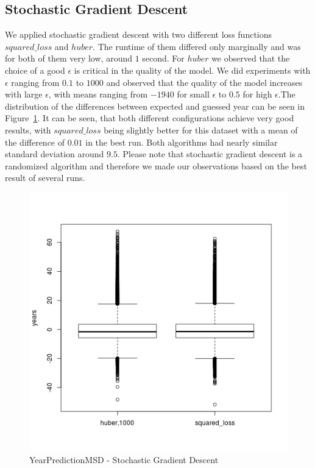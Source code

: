 \subsection{Stochastic Gradient Descent}
We applied stochastic gradient descent with two different loss functions $squared\_loss$ and $huber$. The runtime of them differed only marginally and was for both of them very low, around $1$ second. For $huber$ we observed that the choice of a good $\epsilon$ is critical in the quality of the model. We did experiments with $\epsilon$ ranging from $0.1$ to $1000$ and observed that the quality of the model increases with large $\epsilon$, with means ranging from $-1940$ for small $\epsilon$ to $0.5$ for high $\epsilon$.The distribution of the differences between expected and guessed year can be seen in Figure~\ref{ypmsd:fig:sgdresults}. It can be seen, that both different configurations achieve very good results, with $squared\_loss$ being slightly better for this dataset with a mean of the difference of $0.01$ in the best run. Both algorithms had nearly similar standard deviation around $9.5$. Please note that stochastic gradient descent is a randomized algorithm and therefore we made our observations based on the best result of several runs.
\begin{figure}[p]
	\center
	\includegraphics[scale=\figurescaling]{figures/ypmsd_sgd.png}
	\caption{YearPredictionMSD - Stochastic Gradient Descent\label{ypmsd:fig:sgdresults}}
\end{figure}
